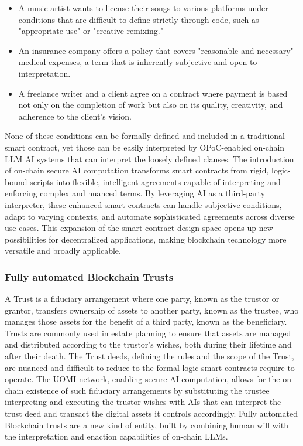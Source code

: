 \documentclass{article}
\begin{document}
\begin{itemize}


\item A music artist wants to license their songs to various platforms under conditions that are difficult to define strictly through code, such as "appropriate use" or "creative remixing." 

\item An insurance company offers a policy that covers "reasonable and necessary" medical expenses, a term that is inherently subjective and open to interpretation.

\item A freelance writer and a client agree on a contract where payment is based not only on the completion of work but also on its quality, creativity, and adherence to the client's vision.

\end{itemize}

None of these conditions can be formally defined and included in a traditional smart contract, yet those can be easily interpreted by OPoC-enabled on-chain LLM AI systems that can interpret the loosely defined clauses. The introduction of on-chain secure AI computation transforms smart contracts from rigid, logic-bound scripts into flexible, intelligent agreements capable of interpreting and enforcing complex and nuanced terms. By leveraging AI as a third-party interpreter, these enhanced smart contracts can handle subjective conditions, adapt to varying contexts, and automate sophisticated agreements across diverse use cases. This expansion of the smart contract design space opens up new possibilities for decentralized applications, making blockchain technology more versatile and broadly applicable.



\subsubsection{Fully automated Blockchain Trusts}

A Trust is a fiduciary arrangement where one party, known as the trustor or grantor, transfers ownership of assets to another party, known as the trustee, who manages those assets for the benefit of a third party, known as the beneficiary. Trusts are commonly used in estate planning to ensure that assets are managed and distributed according to the trustor’s wishes, both during their lifetime and after their death. The Trust deeds, defining the rules and the scope of the Trust, are nuanced and difficult to reduce to the formal logic smart contracts require to operate. The UOMI network, enabling secure AI computation, allows for the on-chain existence of such fiduciary arrangements by substituting the trustee interpreting and executing the trustor wishes with AIs that can interpret the trust deed and transact the digital assets it controls accordingly. Fully automated Blockchain trusts are a new kind of entity, built by combining human will with the interpretation and enaction capabilities of on-chain LLMs. 
\end{document}
